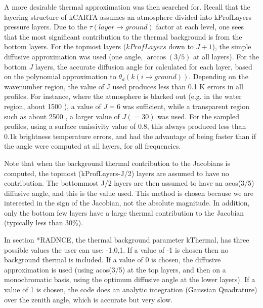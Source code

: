 \documentclass[12pt]{article}
\newcommand{\kc}{\textsf{kCARTA}\xspace}
\begin{document}
{{{{A more desirable thermal approximation was then searched for.  Recall
that the layering structure of \kc assumes an atmosphere divided into
kProfLayers pressure layers.  Due to the $\tau(layer \rightarrow ground)$
factor at each level, one sees that the most significant contribution
to the thermal background is from the bottom layers.  For the topmost
layers ($kProfLayers$ down to $J+1$), the simple diffusive approximation was
used (one angle, $\arccos(3/5)$ at all layers).  For the bottom $J$
layers, the accurate diffusion angle for calculated for each layer,
based on the polynomial approximation to $\theta_{d}(k(i \rightarrow
ground))$.  Depending on the wavenumber region, the value of J used
produces less than 0.1 K errors in all profiles.  For instance, where
the atmosphere is blacked out (e.g. in the water region, about 1500
\wn), a value of $J=6$ was sufficient, while a transparent region such
as about 2500 \wn, a larger value of $J(=30)$ was used.  For the
sampled profiles, using a surface emissivity value of 0.8, this always
produced less than 0.1k brightness temperature errors, and had the
advantage of being faster than if the angle were computed at all
layers, for all frequencies.

Note that when the background thermal contribution to the Jacobians is
computed, the topmost (kProfLayers-J/2) layers are assumed to have no
contribution.  The bottommost J/2 layers are then assumed to have an
acos(3/5) diffusive angle, and this is the value used.  This method is
chosen because we are interested in the sign of the Jacobian, not the
absolute magnitude.  In addition, only the bottom few layers have a
large thermal contribution to the Jacobian (typically less than 30\%).

In section *RADNCE, the thermal background parameter kThermal, has
three possible values the user can use: -1,0,1.  If a value of -1 is
chosen then no background thermal is included.  If a value of 0 is
chosen, the diffusive approximation is used (using acos(3/5) at the
top layers, and then on a monochromatic basis, using the optimum
diffusive angle at the lower layers).  If a value of 1 is chosen, the
code does an analytic integration (Gaussian Quadrature) over the
zenith angle, which is accurate but very slow.

}}}}
\end{document}
